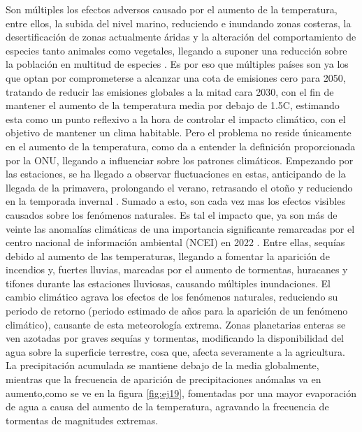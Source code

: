 Son múltiples los efectos adversos causado por el aumento de la temperatura, entre ellos, la subida del nivel marino, reduciendo e inundando zonas costeras, la desertificación de zonas actualmente áridas y la alteración del comportamiento de especies tanto animales como vegetales, llegando a suponer una reducción sobre la población en multitud de especies \cite{arnell2019global} \cite{new2011four}.\newline
\newline
Es por eso que múltiples países son ya los que optan por comprometerse a alcanzar una cota de emisiones cero para 2050, tratando de reducir las emisiones globales a la mitad cara 2030, con el fin de mantener el aumento de la temperatura media por debajo de 1.5\textdegree C, estimando esta como un punto reflexivo a la hora de controlar el impacto climático, con el objetivo de mantener un clima habitable.\newline
\newline
Pero el problema no reside únicamente en el aumento de la temperatura, como da a entender la definición proporcionada por la ONU, llegando a influenciar sobre los patrones climáticos. Empezando por las estaciones, se ha llegado a observar fluctuaciones en estas, anticipando de la llegada de la primavera, prolongando el verano, retrasando el otoño y reduciendo en la temporada invernal \cite{sparks2002observed}.\newline
\newline
Sumado a esto, son cada vez mas los efectos visibles causados sobre los fenómenos naturales. Es tal el impacto que, ya son más de veinte las anomalías climáticas de una importancia significante remarcadas por el centro nacional de información ambiental (NCEI) en 2022 \cite{NCEIWeb}. Entre ellas, sequías debido al aumento de las temperaturas, llegando a fomentar la aparición de incendios y, fuertes lluvias, marcadas por el aumento de tormentas, huracanes y tifones durante las estaciones lluviosas, causando múltiples inundaciones.\newline
\newline
El cambio climático agrava los efectos de los fenómenos naturales, reduciendo su periodo de retorno (periodo estimado de años para la aparición de un fenómeno climático), causante de esta meteorología extrema. Zonas planetarias enteras se ven azotadas por graves sequías y tormentas, modificando la disponibilidad del agua sobre la superficie terrestre, cosa que, afecta severamente a la agricultura. La precipitación acumulada se mantiene debajo de la media globalmente, mientras que la frecuencia de aparición de precipitaciones anómalas va en aumento,como se ve en la figura \ref{fig:ej19}, fomentadas por una mayor evaporación de agua a causa del aumento de la temperatura, agravando la frecuencia de tormentas de magnitudes extremas. 

